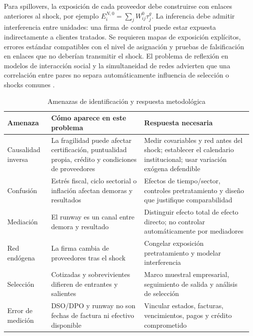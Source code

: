 \documentclass[11pt,a4paper]{article}
\begin{document}
Para spillovers, la exposición de cada proveedor debe construirse con enlaces anteriores al shock, por ejemplo $E_i^{N,0}=\sum_j W^0_{ij}\tau^g_j$. La inferencia debe admitir interferencia entre unidades: una firma de control puede estar expuesta indirectamente a clientes tratados. Se requieren mapas de exposición explícitos, errores estándar compatibles con el nivel de asignación y pruebas de falsificación en enlaces que no deberían transmitir el shock. El problema de reflexión en modelos de interacción social y la simultaneidad de redes advierten que una correlación entre pares no separa automáticamente influencia de selección o shocks comunes \citep{manski1993,bramoulle2009}.

\begin{table}[htbp]\centering\small
\caption{Amenazas de identificación y respuesta metodológica}
\begin{tabularx}{\linewidth}{p{.23\linewidth}X X}
\toprule
Amenaza & Cómo aparece en este problema & Respuesta necesaria \\
\midrule
Causalidad inversa & La fragilidad puede afectar certificación, puntualidad propia, crédito y condiciones de proveedores & Medir covariables y red antes del shock; establecer el calendario institucional; usar variación exógena defendible \\
Confusión & Estrés fiscal, ciclo sectorial o inflación afectan demoras y resultados & Efectos de tiempo/sector, controles pretratamiento y diseño que justifique comparabilidad \\
Mediación & El runway es un canal entre demora y resultado & Distinguir efecto total de efecto directo; no controlar automáticamente por mediadores \\
Red endógena & La firma cambia de proveedores tras el shock & Congelar exposición pretratamiento y modelar interferencia \\
Selección & Cotizadas y sobrevivientes difieren de entrantes y salientes & Marco muestral empresarial, seguimiento de salida y análisis de selección \\
Error de medición & DSO/DPO y runway no son fechas de factura ni efectivo disponible & Vincular estados, facturas, vencimientos, pagos y crédito comprometido \\
\bottomrule
\end{tabularx}\end{table}
\end{document}
